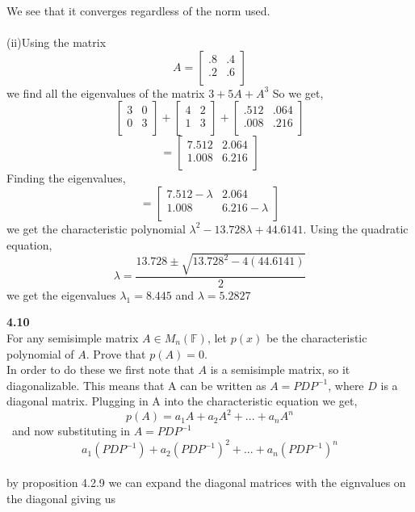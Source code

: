 \documentclass[letterpaper,12pt]{article}
\theoremstyle{definition}
\begin{document}
 We see that it converges regardless of the norm used.\\
 \\(ii)Using the matrix 
 \[A=
  \begin{bmatrix}
   .8 &  .4 \\
   .2 &  .6\\
  \end{bmatrix}\]
 we find all the eigenvalues of the matrix $3+ 5A +A^3$
 So we get,
 \[
  \begin{bmatrix}
   3 &  0 \\
   0 &  3\\
  \end{bmatrix}+
   \begin{bmatrix}
   4 &  2 \\
   1 & 3 \\
  \end{bmatrix}+
   \begin{bmatrix}
   .512 &  .064 \\
   .008 & .216 \\ 
  \end{bmatrix}\]
  \[=
  \begin{bmatrix}
   7.512&  2.064 \\
   1.008 & 6.216 \\ 
  \end{bmatrix}\]
  Finding the eigenvalues,
\[=
  \begin{bmatrix}
   7.512- \lambda&  2.064 \\
   1.008 & 6.216- \lambda \\ 
  \end{bmatrix}\]
we get the characteristic polynomial $\lambda ^2 -13.728\lambda + 44.6141$. Using the quadratic equation,
\[\lambda= \frac{13.728 \pm \sqrt{13.728^2 - 4(44.6141)}}{2}\]
we get the eigenvalues $\lambda_{1} = 8.445$ and $\lambda = 5.2827$

\textbf{4.10}\\
For any semisimple matrix $A\in M_n(\mathbb{F})$, let $p(x)$ be the characteristic polynomial of $A$. Prove that $p(A)=0$.\\
\indent In order to do these we first note that $A$ is a semisimple matrix, so it diagonalizable. This means that A can be written as $A= PDP^{-1}$, where $D$ is a diagonal matrix. Plugging in A into the characteristic equation we get,
\[p(A) = a_1A + a_2A^2 +...+a_nA^n\]\
and now substituting in $A= PDP^{-1}$
\[a_1(PDP^{-1}) + a_2(PDP^{-1})^2 +...+a_n(PDP^{-1})^n\]\\
by proposition 4.2.9 we can expand the diagonal matrices with the eignvalues on the diagonal giving us\\
\end{document}
